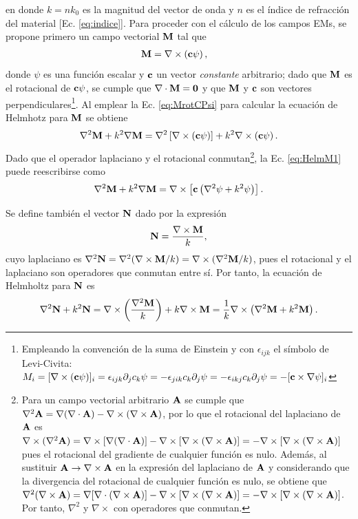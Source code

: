 en donde $k = n k_0$ es la magnitud del vector de onda y $n$ es el índice de refracción del material [Ec. \eqref{eq:indice}]. Para proceder con el cálculo de los campos EMs, se propone primero un campo vectorial $\vb{M}$ tal que
	\begin{align}
	\vb{M} &= \nabla \times \left(\vb{c} \psi\right),
	\label{eq:MrotCPsi}
	\end{align}
donde $\psi$ es una función escalar y $\vb{c}$ un vector \emph{constante} arbitrario; dado que $\vb{M}$ es el rotacional de  $\vb{c}\psi$, se cumple que $\nabla\cdot \vb{M} = \vb{0}$ y que $\vb{M}$ y $\vb{c}$ son vectores perpendiculares\footnote{Empleando la convención de la suma de Einstein y con $\epsilon_{ijk}$ el símbolo de  Levi-Civita: $M_i = [\nabla\times(\vb{c}\psi)]_i =  \epsilon_{ijk}\partial_jc_k\psi = -\epsilon_{jik}c_k\partial_j\psi = -\epsilon_{ikj}c_k\partial_j\psi  = - [\vb{c}\times\nabla\psi]_i$}. Al emplear la Ec. \eqref{eq:MrotCPsi} para calcular la ecuación de Helmhotz para $\vb{M}$ se obtiene
	\begin{equation}
	\nabla^2 \vb{M} + k^2 \nabla\vb{M} = \nabla^2 \left[ \nabla\times\left(\vb{c} \psi\right) \right]+ 
			k^2 \nabla \times \left(\vb{c} \psi\right).\label{eq:HelmM1}
	\end{equation}
Dado que el operador laplaciano y el rotacional conmutan\footnote{ Para un campo vectorial arbitrario $\vb{A}$ se cumple que $\nabla^2\vb{A} = \nabla(\nabla\cdot\vb{A}) - \nabla\times(\nabla\times\vb{A})$, por lo que el rotacional del laplaciano de $\vb{A}$ es $ \nabla\times( \nabla^2\vb{A})=\nabla\times[\nabla(\nabla\cdot\vb{A})  ]-  \nabla\times[\nabla\times(\nabla\times \vb{A})] = -  \nabla\times[\nabla\times(\nabla\times \vb{A})] $ pues el rotacional del gradiente de cualquier función es nulo. Además, al sustituir $\vb{A}\to \nabla\times\vb{A}$ en la expresión del laplaciano de $\vb{A}$ y  considerando que la divergencia del rotacional de cualquier función es nulo, se obtiene que$ \nabla^2(\nabla\times\vb{A})=\nabla[\nabla\cdot(\nabla\times\vb{A})  ]-  \nabla\times[\nabla\times(\nabla\times \vb{A})] = -  \nabla\times[\nabla\times(\nabla\times \vb{A})] $. Por tanto, $\nabla^2$ y $\nabla\times$ con operadores que conmutan.}, la Ec. \eqref{eq:HelmM1} puede reescribirse como
	\begin{equation}
	\nabla^2 \vb{M} + k^2 \nabla\vb{M}  = \nabla\times\left[\vb{c}\left( \nabla^2\psi+k^2\psi \right) \right].
	\end{equation}
	
Se define también el vector $\vb{N}$ dado por la expresión
	\begin{equation}
	\vb{N} = \frac{\nabla\times \vb{M}}{k}, \label{eq:NrotM/k}
	\end{equation}
cuyo laplaciano es $\nabla^2 \vb{N} = \nabla^2( \nabla\times \vb{M} /k) =  \nabla\times (\nabla^2\vb{M} /k) $, pues el rotacional y el laplaciano son operadores que conmutan entre sí. Por tanto, la ecuación de Helmholtz para $\vb{N}$ es
	\begin{align}
	\nabla^2 \vb{N} + k^2 \vb{N} =  \nabla\times \left( \frac{\nabla^2 \vb{M}}{k} \right) + k \nabla\times \vb{M} 
		 = \frac{1}{k} \nabla\times \left( \nabla^2 \vb{M} + k^2  \vb{M} \right).
	\end{align}


